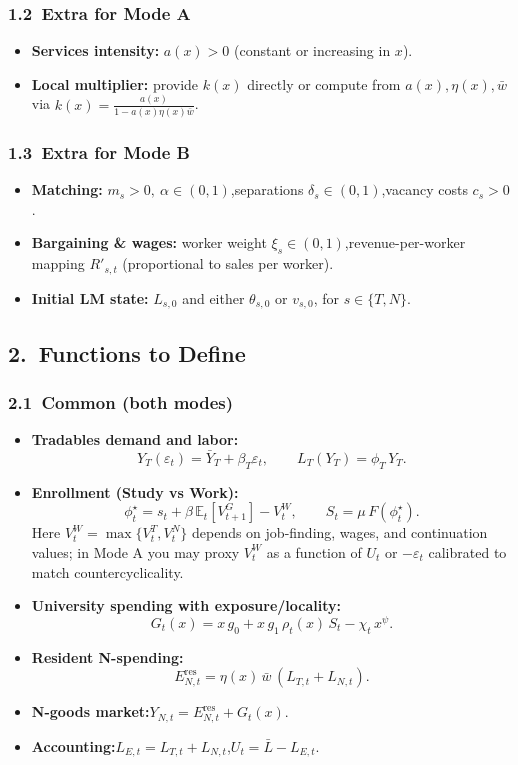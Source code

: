 \subsubsection*{1.2\ Extra for Mode A}
\begin{itemize}
	\item \textbf{Services intensity:} $a(x)>0$ (constant or increasing in $x$).
	\item \textbf{Local multiplier:} provide $k(x)$ directly or compute from $a(x),\eta(x),\bar w$ via
	\(k(x)=\frac{a(x)}{1-a(x)\eta(x)\bar w}\).
\end{itemize}

\subsubsection*{1.3\ Extra for Mode B}
\begin{itemize}
	\item \textbf{Matching:} $m_s>0,\ \alpha\in(0,1)$,\quad separations $\delta_s\in(0,1)$,\quad vacancy costs $c_s>0$.
	\item \textbf{Bargaining \& wages:} worker weight $\xi_s\in(0,1)$,\quad revenue-per-worker mapping $R'_{s,t}$ (proportional to sales per worker).
	\item \textbf{Initial LM state:} $L_{s,0}$ and either $\theta_{s,0}$ or $v_{s,0}$, for $s\in\{T,N\}$.
\end{itemize}

\subsection*{2.\ Functions to Define}

\subsubsection*{2.1\ Common (both modes)}
\begin{itemize}
	\item \textbf{Tradables demand and labor:}
	\[
	Y_T(\varepsilon_t)=\bar Y_T+\beta_T\varepsilon_t,\qquad
	L_T(Y_T)=\phi_T\,Y_T.
	\]
	\item \textbf{Enrollment (Study vs Work):}
	\[
	\phi_t^\star = s_t+\beta\,\mathbb{E}_t[V^G_{t+1}] - V^W_t,\qquad
	S_t=\mu\,F(\phi_t^\star).
	\]
	Here $V^W_t=\max\{V^T_t,V^N_t\}$ depends on job-finding, wages, and continuation values; in Mode A you may proxy $V^W_t$ as a function of $U_t$ or $-\varepsilon_t$ calibrated to match countercyclicality.
	\item \textbf{University spending with exposure/locality:}
	\[
	G_t(x)=x\,g_0 + x\,g_1\,\rho_t(x)\,S_t - \chi_t\,x^{\psi}.
	\]
	\item \textbf{Resident N-spending:}
	\[
	E^{\mathrm{res}}_{N,t}=\eta(x)\,\bar w\,(L_{T,t}+L_{N,t}).
	\]
	\item \textbf{N-goods market:}\quad $Y_{N,t}=E^{\mathrm{res}}_{N,t}+G_t(x)$.
	\item \textbf{Accounting:}\quad $L_{E,t}=L_{T,t}+L_{N,t}$,\quad $U_t=\bar L - L_{E,t}$.
\end{itemize}

